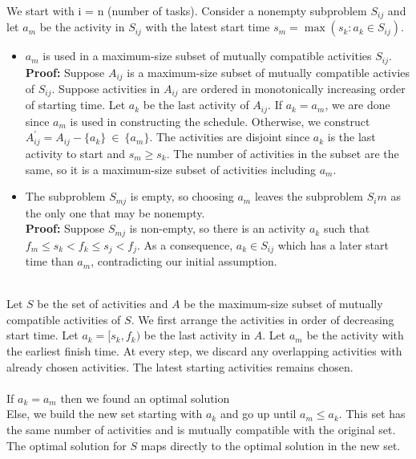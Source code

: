 \documentclass[11pt]{article}
\begin{document}
\begin{enumerate}
    \\ We start with i = n (number of tasks). Consider a nonempty subproblem $S_{ij}$ and let $a_m$ be the activity in $S_{ij}$ with the latest start time $s_m = \max(s_k : a_k \in S_{ij})$.
    \begin{itemize}
        \item $a_m$ is used in a maximum-size subset of mutually compatible activities $S_{ij}$.
        \\ \textbf{Proof: } Suppose $A_{ij}$ is a maximum-size subset of mutually compatible activies of $S_{ij}$.
        Suppose activities in $A_{ij}$ are ordered in monotonically increasing order of starting time.
        Let $a_k$ be the last activity of $A_{ij}$. If $a_k = a_m$, we are done since $a_m$ is used in constructing the schedule. Otherwise, we construct $A^{'}_{ij} = A_{ij} - \{a_k\}\ \in \ \{a_m\}$. The activities are disjoint since $a_k$ is the last activity to start and $s_m \geq s_k$. The number of activities in the subset are the same, so it is a maximum-size subset of activities including $a_m$.
        \item The subproblem $S_{mj}$ is empty, so choosing $a_m$ leaves the subproblem $S_im$ as the only one that may be nonempty.
        \\ \textbf{Proof: } Suppose $S_{mj}$ is non-empty, so there is an activity $a_k$ such that $f_m \leq s_k < f_k \leq s_j < f_j$. As a consequence, $a_k \in S_{ij}$ which has a later start time than $a_m$, contradicting our initial assumption.
    \end{itemize}
    


    \\ Let $S$ be the set of activities and $A$ be the maximum-size subset of mutually compatible activities of $S$. We first arrange the activities in order of decreasing start time. Let $a_k = [s_k, f_k)$ be the last activity in $A$. Let $a_m$ be the activity with the earliest finish time. At every step, we discard any overlapping activities with already chosen activities. The latest starting activities remains chosen.
    \\\\ If $a_k = a_m$ then we found an optimal solution
    \\ Else, we build the new set starting with $a_k$ and go up until $a_m \leq a_k$. This set has the same number of activities and is mutually compatible with the original set. The optimal solution for $S$ maps directly to the optimal solution in the new set.    


\end{enumerate}
\end{document}
